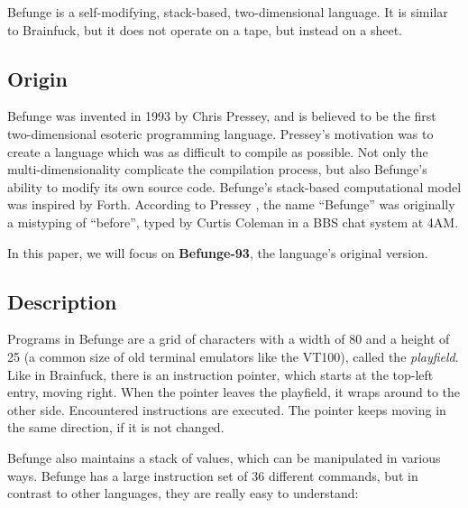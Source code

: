 Befunge is a self-modifying, stack-based, two-dimensional language. It is similar to Brainfuck, but it does not operate on a tape, but instead on a sheet.

\subsection{Origin}

Befunge was invented in 1993 by Chris Pressey, and is believed to be the first two-dimensional esoteric programming language. Pressey's motivation was to create a language which was as difficult to compile as possible. Not only the multi-dimensionality complicate the compilation process, but also Befunge's ability to modify its own source code. Befunge's stack-based computational model was inspired by Forth. According to Pressey \cite{pressey_coleman}, the name “Befunge” was originally a mistyping of “before”, typed by Curtis Coleman in a BBS chat system at 4AM.

In this paper, we will focus on \textbf{Befunge-93}, the language's original version.

\subsection{Description}

Programs in Befunge are a grid of \ascii{} characters with a width of 80 and a height of 25 (a common size of old terminal emulators like the VT100), called the \emph{playfield}. Like in Brainfuck, there is an instruction pointer, which starts at the top-left entry, moving right. When the pointer leaves the playfield, it wraps around to the other side. Encountered instructions are executed. The pointer keeps moving in the same direction, if it is not changed.

Befunge also maintains a stack of values, which can be manipulated in various ways. Befunge has a large instruction set of 36 different commands, but in contrast to other languages, they are really easy to understand:

